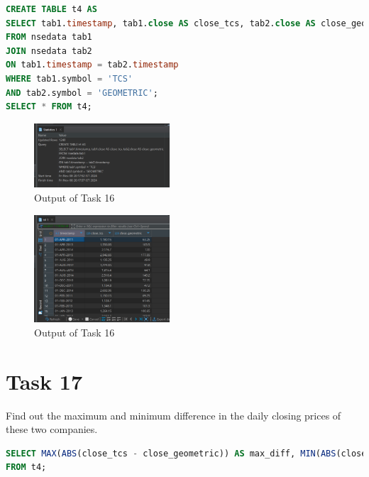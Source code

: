 \documentclass{article}
\begin{document}
\begin{lstlisting}[language=SQL, caption=Creating Table t4]
CREATE TABLE t4 AS
SELECT tab1.timestamp, tab1.close AS close_tcs, tab2.close AS close_geometric
FROM nsedata tab1
JOIN nsedata tab2
ON tab1.timestamp = tab2.timestamp
WHERE tab1.symbol = 'TCS'
AND tab2.symbol = 'GEOMETRIC';
SELECT * FROM t4;
\end{lstlisting}

\begin{figure}[H]
	\centering
	\includegraphics[width=0.45\textwidth]{Images/Task16-1.png}
	\caption{Output of Task 16}
\end{figure}

\begin{figure}[H]
	\centering
	\includegraphics[width=0.45\textwidth]{Images/Task16-2.png}
	\caption{Output of Task 16}
\end{figure}

\clearpage

\section*{Task 17}

\begin{task*}[17]
Find out the maximum and minimum difference in the daily closing prices of these two companies.
\end{task*}

\begin{lstlisting}[language=SQL, caption=Finding the Maximum and Minimum Difference in Closing Prices]
SELECT MAX(ABS(close_tcs - close_geometric)) AS max_diff, MIN(ABS(close_tcs - close_geometric)) AS min_diff
FROM t4;
\end{lstlisting}
\end{document}
